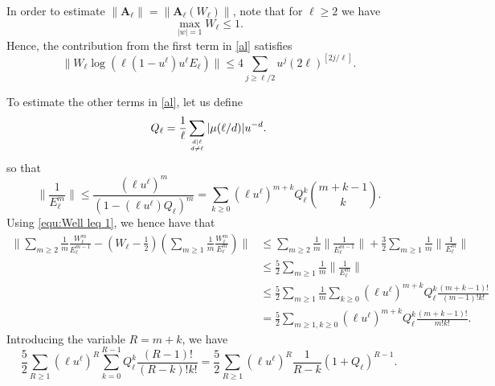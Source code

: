 \documentclass[12pt]{amsart}
\theoremstyle{definition}
\numberwithin{equation}{section}
\theoremstyle{definition} %
\theoremstyle{remark}
\begin{document}
In order to estimate $\|\mathbf{A}_\ell\| = \|\mathbf{A}_\ell(W_\ell)\|$, note that for $\ell\geq 2$ we have
\begin{equation}\label{equ:Well leq 1}
\max_{|w|=1} W_\ell \leq 1.
\end{equation}
Hence, the contribution from the first term in \eqref{al} satisfies
\begin{equation}\label{equ:first Al}
\|W_\ell \log(\ell (1-u^\ell) u^\ell E_\ell) \|
\leq 4 \sum_{j\geq \ell/2} u^j(2\ell)^{[2j/\ell]}.
\end{equation}


To estimate the other terms in \eqref{al}, let us define 
\begin{equation}\label{equ:Qell def}
Q_\ell = \frac 1\ell 
\sum_{d\mid \ell\atop d\neq \ell} |\mu(\ell/d)| u^{-d}.
\end{equation}
so that  
\[
\Big\|\frac1{E_\ell^m}\Big\|
\leq 
\frac{(\ell u^\ell)^{m}}{(1-(\ell u^\ell) Q_\ell)^m}
=
\sum_{k\geq 0}
(\ell u^\ell)^{m+k} Q_\ell^k \binom{m+k-1}{k}.
\]
Using \eqref{equ:Well leq 1}, we hence have that 
\begin{align*}
\Big\| 
\sum_{m\geq 2} \frac 1m \frac{W_\ell^m}{E_\ell^{m-1}}
-(W_\ell-\textstyle{\frac 1 2} )(\sum_{m\geq 1} \frac 1m \frac{W_\ell^m}{E_\ell^m} ) 
\Big\|
&\leq 
\sum_{m\geq 2} \frac 1m \Big\| \frac{1}{E_\ell^{m-1}}\Big\| 
+\frac 3 2 \sum_{m\geq 1} \frac 1m \Big\| \frac{1}{E_\ell^m}\Big\|  
\\&\leq
\frac 5 2 \sum_{m\geq 1} \frac 1m \Big\| \frac{1}{E_\ell^m}\Big\| 
\\&\leq
\frac52 \sum_{m\geq 1} \frac 1m \sum_{k\geq 0} (\ell u^\ell)^{m+k} Q_\ell^k \frac{(m+k-1)!}{(m-1)!k!}
\\&=
\frac52 \sum_{m\geq 1,k\geq 0} (\ell u^\ell)^{m+k} Q_\ell^k \frac{(m+k-1)!}{m!k!}
.
\end{align*}
Introducing the variable $R=m+k$, we have 
\[
\frac52 \sum_{R\geq 1}(\ell u^\ell)^{R} \sum_{k=0}^{R-1} Q_\ell^k \frac{(R-1)!}{(R-k)!k!}
=
\frac52 \sum_{R\geq 1}(\ell u^\ell)^{R} \frac1{R-k} (1+ Q_\ell)^{R-1}.
\]
\end{document}
